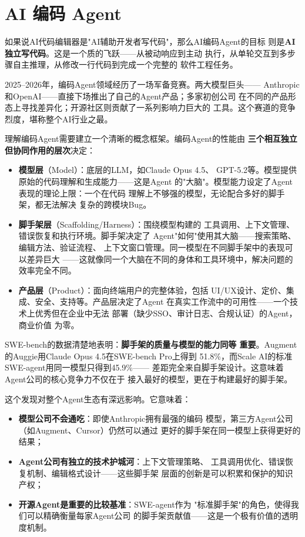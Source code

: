 \section{AI 编码 Agent}
\label{sec:devtools-agents}

如果说AI代码编辑器是"AI辅助开发者写代码"，那么AI编码Agent的目标
则是\textbf{AI独立写代码}。这是一个质的飞跃——从被动响应到主动
执行，从单轮交互到多步骤自主推理，从修改一行代码到完成一个完整的
软件工程任务。

2025--2026年，编码Agent领域经历了一场军备竞赛。两大模型巨头——
Anthropic和OpenAI——直接下场推出了自己的Agent产品；多家初创公司
在不同的产品形态上寻找差异化；开源社区则贡献了一系列影响力巨大的
工具。这个赛道的竞争烈度，堪称整个AI行业之最。

理解编码Agent需要建立一个清晰的概念框架。编码Agent的性能由
\textbf{三个相互独立但协同作用的层次}决定：

\begin{itemize}
  \item \textbf{模型层}（Model）：底层的LLM，如Claude Opus 4.5、
    GPT-5.2等。模型提供原始的代码理解和生成能力——这是Agent
    的"大脑"。模型能力设定了Agent表现的理论上限：一个在代码
    理解上不够强的模型，无论配合多好的脚手架，都无法解决
    复杂的跨模块Bug。
  \item \textbf{脚手架层}（Scaffolding/Harness）：围绕模型构建的
    工具调用、上下文管理、错误恢复和执行环境。脚手架决定了
    Agent"如何"使用其大脑——搜索策略、编辑方法、验证流程、
    上下文窗口管理。同一模型在不同脚手架中的表现可以差异巨大
    ——这就像同一个大脑在不同的身体和工具环境中，解决问题的
    效率完全不同。
  \item \textbf{产品层}（Product）：面向终端用户的完整体验，包括
    UI/UX设计、定价、集成、安全、支持等。产品层决定了Agent
    在真实工作流中的可用性——一个技术上优秀但在企业中无法
    部署（缺少SSO、审计日志、合规认证）的Agent，商业价值
    为零。
\end{itemize}

SWE-bench的数据清楚地表明：\textbf{脚手架的质量与模型的能力同等
重要}。Augment的Auggie用Claude Opus 4.5在SWE-bench Pro上得到
51.8\%，而Scale AI的标准SWE-agent用同一模型只得到45.9\%——
差距完全来自脚手架设计。这意味着Agent公司的核心竞争力不仅在于
接入最好的模型，更在于构建最好的脚手架。

这个发现对整个Agent生态有深远影响。它意味着：
\begin{itemize}
  \item \textbf{模型公司不会通吃}：即使Anthropic拥有最强的编码
    模型，第三方Agent公司（如Augment、Cursor）仍然可以通过
    更好的脚手架在同一模型上获得更好的结果；
  \item \textbf{Agent公司有独立的技术护城河}：上下文管理策略、
    工具调用优化、错误恢复机制、编辑格式设计——这些脚手架
    层面的创新是可以积累和保护的知识产权；
  \item \textbf{开源Agent是重要的比较基准}：SWE-agent作为
    "标准脚手架"的角色，使得我们可以精确衡量每家Agent公司
    的脚手架贡献值——这是一个极有价值的透明度机制。
\end{itemize}

